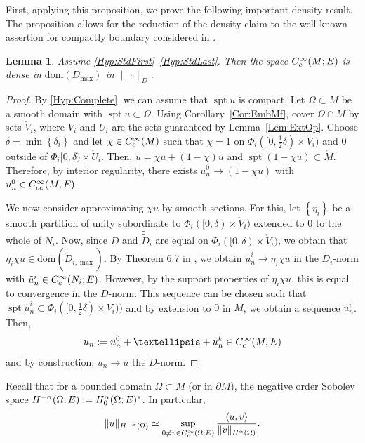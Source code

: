 \documentclass[a4paper,10pt,reqno]{amsart}
\newcommand{\dbrac}[1]{\left\{#1\right\}}
\newcommand{\interior}[1]{\mathring{#1}}
\newcommand{\dtilde}[1]{\tilde{\tilde{#1}}}%
\newcommand{\norm}[1]{\| #1 \|}%
\newcommand{\set}[1]{\dbrac{#1}}
\newcommand{\Ck}[2][{}]{{\rm C}^{#2}_{\rm #1}}%
\newcommand{\Hard}[2][{}]{{\rm H}^{#2}_{\rm #1}}%
\newcommand{\SobH}[2][{}]{\Hard[#1]{\rm #2}}
\newcommand{\dom}{\mathrm{dom}}
\DeclareMathOperator{\spt}{spt}%
\newcommand{\inprod}[1]{\left\langle #1 \right\rangle}%
\newcommand{\dM}{\partial M}
\newtheorem{lemma}[theorem]{Lemma}
\theoremstyle{definition}
\begin{document}
First, applying this proposition, we prove the following important density result.
The proposition allows for the reduction of the density claim to the well-known assertion for compactly boundary considered in \cite{BB12}.

\begin{lemma}
\label{Lem:Density}
Assume \ref{Hyp:StdFirst}--\ref{Hyp:StdLast}.
Then the space $\Ck[c]{\infty}(M;E)$ is dense in $\dom(D_{\max})$ in $\norm{\cdot}_D$.
\end{lemma}
\begin{proof}
By \ref{Hyp:Complete}, we can assume that $\spt u$ is compact.
Let $\Omega \subset M$ be a smooth domain with $\spt u \subset \Omega$.
Using Corollary~\ref{Cor:EmbMf}, cover $\Omega \cap  M$ by sets $\interior{V}_i$, where $V_i$ and $U_i$ are the sets guaranteed by Lemma~\ref{Lem:ExtOp}.
Choose $\delta = \min\set{\delta_i}$ and let $\chi \in \Ck[c]{\infty}(M)$ such that $\chi = 1$ on $\Phi_i([0, \frac12 \delta) \times \interior{V}_i)$ and $0$ outside of $\Phi_i[0,\delta) \times \interior{U}_i$.
Then, $u = \chi u + (1 - \chi)u$ and $\spt (1 - \chi u) \subset \interior{M}$.
Therefore, by interior regularity, there exists $u^0_n \to (1  - \chi u)$ with $u^0_n \in \Ck[cc]{\infty}(M,E)$.

We now consider approximating $\chi u$ by smooth sections.
For this, let $\set{\eta_i}$ be a smooth partition of unity subordinate to $\Phi_i ([0,\delta)\times \interior{V}_i)$ extended to $0$ to the whole of $N_i$.
Now, since $D$ and $\dtilde{D}_i$ are equal on $\Phi_i ([0,\delta) \times \interior{V}_i)$, we obtain that $\eta_i \chi u \in \dom(\dtilde{D}_{i,\max})$.
By Theorem 6.7 in \cite{BB12}, we obtain $\tilde{u}^i_n \to \eta_i \chi u$ in the $\dtilde{D}_i$-norm with $\tilde{u}^i_n \in \Ck[c]{\infty}(N_i;E)$.
However, by the support properties of $\eta_i \chi u$, this is equal to convergence in the $D$-norm.
This sequence can be chosen such that $\spt \tilde{u}^i_n \subset \Phi_i ([0,  \frac12 \delta) \times V_i))$ and by extension to $0$  in $M$, we obtain a sequence $u^i_n$.
Then,
$$ u_n := u^0_n + \dots + u^k_n \in \Ck[c]{\infty}(M,E)$$
and by construction, $u_n \to u$ the $D$-norm.
\end{proof}

Recall that for a bounded domain $\Omega \subset M$ (or in $\dM$), the negative order Sobolev space $\SobH{-\alpha}(\Omega;E) := \SobH[0]{\alpha}(\Omega;E)^\ast$.
In particular,
$$\norm{u}_{\SobH{-\alpha}(\Omega)} \simeq \sup_{0 \neq v \in \Ck[c]{\infty}(\Omega;E)} \frac{\inprod{u,v}}{\norm{v}_{\SobH{\alpha}(\Omega)}}.$$
\end{document}
